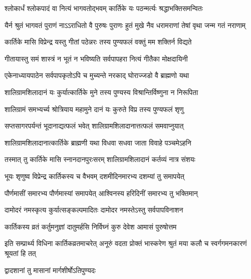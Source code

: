 \twolineshloka
{श्लोकार्धं श्लोकपादं वा नित्यं भागवतोद्भवम्}
{कार्तिके यः पठन्मर्त्यः श्रद्धाभक्तिसमन्वितः} %

\fourlineindentedshloka
{यैर्न श्रुतं भागवतं पुराणं}
{नाऽऽराधितो वै पुरुषः पुराणः}
{हुतं मुखे नैव धरामराणां}
{तेषां वृथा जन्म गतं नराणाम्} %

\twolineshloka
{कार्तिके मासि विप्रेन्द्र यस्तु गीतां पठेन्नरः}
{तस्य पुण्यफलं वक्तुं मम शक्तिर्न विद्यते} %

\twolineshloka
{गीतायास्तु समं शास्त्रं न भूतं न भविष्यति}
{सर्वपापहरा नित्यं गीतैका मोक्षदायिनी} %

\twolineshloka
{एकेनाध्यायपाठेन सर्वपापकृतोऽपि च}
{मुच्यन्ते नरकाद् घोराज्जडो वै ब्राह्मणो यथा} %

\twolineshloka
{शालिग्रामशिलादानं यः कुर्यात्कार्तिके मुने}
{तस्य पुण्यस्य विश्रान्तिर्विष्णुना न निरूपिता} %

\twolineshloka
{शालिग्रामं समभ्यर्च्य श्रोत्रियाय महामुने}
{दानं यः कुरुते विप्र तस्य पुण्यफलं शृणु} %

\twolineshloka
{सप्तसागरपर्यन्तं भूदानाद्यत्फलं भवेत्}
{शालिग्रामशिलादानात्तत्फलं समवाप्नुयात्} %

\twolineshloka
{शालिग्रामशिलादानात्कार्तिके ब्राह्मणी यथा}
{विधवा सधवा जाता विवाहे पञ्चमेऽहनि} %

\twolineshloka
{तस्मात् तु कार्तिके मासि स्नानदानपुरःसरम्}
{शालिग्रामशिलादानं कर्तव्यं नात्र संशयः} %





\twolineshloka
{भूयः शृणुष्व विप्रेन्द्र कार्तिकस्य च वैभवम्}
{दशमीदिनमारभ्य दशम्यां तु समापयेत्} %

\twolineshloka
{पौर्णमासीं समारभ्य पौर्णमास्यां समापयेत्}
{आश्विनस्य हरिदिनीं समारभ्य तु भक्तिमान्} %

\twolineshloka
{दामोदरं नमस्कृत्य कुर्यात्सङ्कल्पमादितः}
{दामोदर नमस्तेऽस्तु सर्वपापविनाशन} %

\twolineshloka
{कार्तिकस्य व्रतं कर्तुमनुज्ञां दातुमर्हसि}
{निर्विघ्नं कुरु देवेश आमासं पुरुषोत्तम} %

\threelineshloka
{इति सम्प्रार्थ्य विधिना कार्तिकव्रतमाचरेत्}
{अनूरुं वदता प्रोक्तं भास्करेण श्रुतं मया}
{कलौ च स्वर्गगमनकारणं श्रूयतां हि तत्} %



\onelineshloka
{द्वादशानां तु मासानां मार्गशीर्षोऽतिपुण्यदः} %

